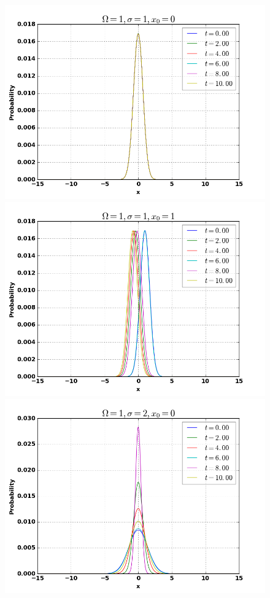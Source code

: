 \documentclass[12pt,a4paper]{article}
\begin{document}
\begin{figure}
\centering
\includegraphics[scale=0.4]{Bilder/110.png}
\includegraphics[scale=0.4]{Bilder/111.png}
\includegraphics[scale=0.4]{Bilder/120.png}

\end{figure}
\end{document}
